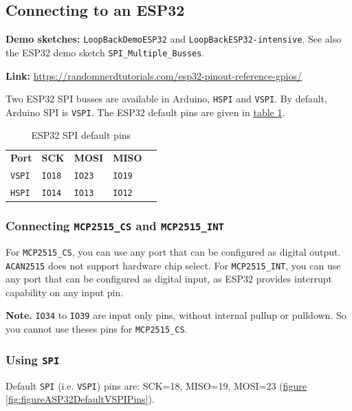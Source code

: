 \documentclass[9pt, a4paper, obeyspaces]{extarticle}
\newcommand \subsectionLabel[2]{\subsection{#1}\label{subsec:#2}}
\newcommand\labelTableau[1]{\label{tab:#1}}
\newcommand\refTableau[1]{\hyperref[tab:#1]{table \ref*{tab:#1}}}
\newcommand\refFigure[2]{\hyperref[fig:#2]{figure \ref*{fig:#2}{\ifthenelse{\equal{#1}{}}{}{.#1}}}}
\begin{document}
\subsectionLabel{Connecting to an ESP32}{connectionESP32}

{\bf Demo sketches: } \texttt{LoopBackDemoESP32} and \texttt{LoopBackESP32-intensive}. See also the ESP32 demo sketch \texttt{SPI\_Multiple\_Busses}.

{\bf Link:} \url{https://randomnerdtutorials.com/esp32-pinout-reference-gpios/}

Two ESP32 SPI busses are available in Arduino, \texttt{HSPI} and \texttt{VSPI}. By default, Arduino SPI is \texttt{VSPI}. The ESP32 default pins are given in \refTableau{ESP32SPIdefaultPins}.


\begin{table}[!ht]
  \small
  \onehalfspacing
  \centering
  \begin{tabular}{lllll}
    \textbf{Port} & \textbf{SCK} & \textbf{MOSI} & \textbf{MISO}\\
    \texttt{VSPI} & \texttt{IO18} & \texttt{IO23} & \texttt{IO19}\\
    \texttt{HSPI} & \texttt{IO14} & \texttt{IO13} & \texttt{IO12}\\
  \end{tabular}
  \caption{ESP32 SPI default pins}
  \labelTableau{ESP32SPIdefaultPins}
\end{table}



\subsubsection{Connecting \texttt{MCP2515\_CS} and \texttt{MCP2515\_INT}}
 For \texttt{MCP2515\_CS}, you can use any port that can be configured as digital output. \texttt{ACAN2515} does not support hardware chip select. For \texttt{MCP2515\_INT}, you can use any port that can be configured as digital input, as ESP32 provides interrupt capability on any input pin.
  
{\bf Note.} \texttt{IO34} to \texttt{IO39} are input only pins, without internal pullup or pulldown. So you cannot use theses pins for \texttt{MCP2515\_CS}.







\subsubsection{Using \texttt{SPI}}
  Default \texttt{SPI} (i.e. \texttt{VSPI}) pins are: SCK=18, MISO=19, MOSI=23 (\refFigure{}{figureASP32DefaultVSPIPins}).
  
\end{document}
